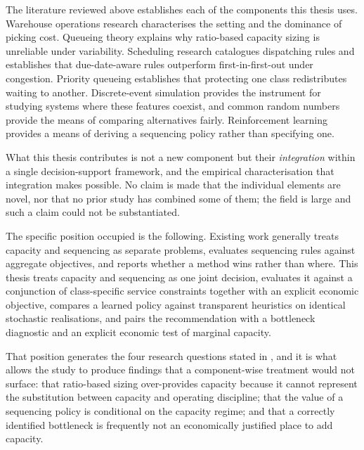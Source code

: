 The literature reviewed above establishes each of the components this thesis uses. Warehouse
operations research characterises the setting and the dominance of picking cost. Queueing theory
explains why ratio-based capacity sizing is unreliable under variability. Scheduling research
catalogues dispatching rules and establishes that due-date-aware rules outperform
first-in-first-out under congestion. Priority queueing establishes that protecting one class
redistributes waiting to another. Discrete-event simulation provides the instrument for studying
systems where these features coexist, and common random numbers provide the means of comparing
alternatives fairly. Reinforcement learning provides a means of deriving a sequencing policy
rather than specifying one.

What this thesis contributes is not a new component but their \emph{integration} within a single
decision-support framework, and the empirical characterisation that integration makes possible.
No claim is made that the individual elements are novel, nor that no prior study has combined
some of them; the field is large and such a claim could not be substantiated.

The specific position occupied is the following. Existing work generally treats capacity and
sequencing as separate problems, evaluates sequencing rules against aggregate objectives, and
reports whether a method wins rather than where. This thesis treats capacity and sequencing as
one joint decision, evaluates it against a conjunction of class-specific service constraints
together with an explicit economic objective, compares a learned policy against transparent
heuristics on identical stochastic realisations, and pairs the recommendation with a bottleneck
diagnostic and an explicit economic test of marginal capacity.

That position generates the four research questions stated in , and
it is what allows the study to produce findings that a component-wise treatment would not
surface: that ratio-based sizing over-provides capacity because it cannot represent the
substitution between capacity and operating discipline; that the value of a sequencing policy is
conditional on the capacity regime; and that a correctly identified bottleneck is frequently not
an economically justified place to add capacity.
